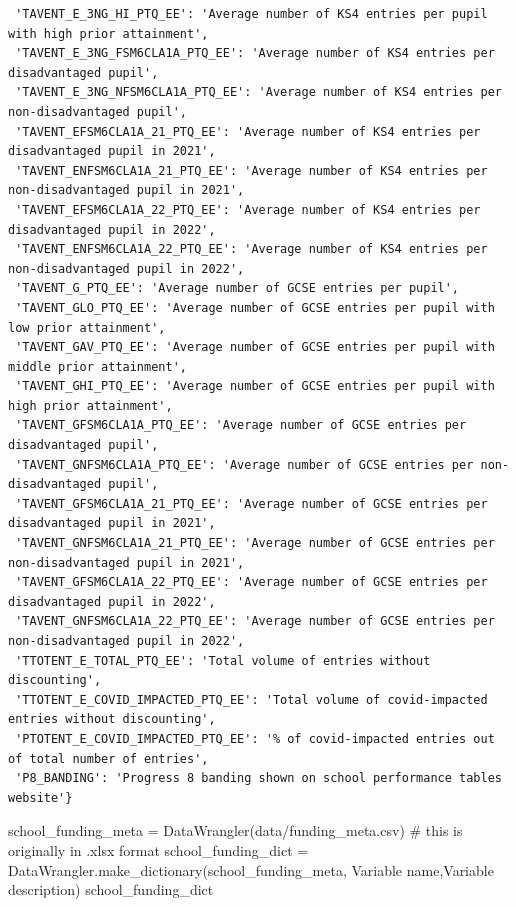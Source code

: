 \documentclass[
  letterpaper,
  DIV=11,
  numbers=noendperiod]{scrartcl}
\newenvironment{Shaded}{\begin{snugshade}}{\end{snugshade}}
\newcommand{\CommentTok}[1]{\textcolor[rgb]{0.37,0.37,0.37}{#1}}
\newcommand{\NormalTok}[1]{\textcolor[rgb]{0.00,0.23,0.31}{#1}}
\newcommand{\OperatorTok}[1]{\textcolor[rgb]{0.37,0.37,0.37}{#1}}
\newcommand{\StringTok}[1]{\textcolor[rgb]{0.13,0.47,0.30}{#1}}
\begin{document}
\begin{verbatim}
 'TAVENT_E_3NG_HI_PTQ_EE': 'Average number of KS4 entries per pupil with high prior attainment',
 'TAVENT_E_3NG_FSM6CLA1A_PTQ_EE': 'Average number of KS4 entries per disadvantaged pupil',
 'TAVENT_E_3NG_NFSM6CLA1A_PTQ_EE': 'Average number of KS4 entries per non-disadvantaged pupil',
 'TAVENT_EFSM6CLA1A_21_PTQ_EE': 'Average number of KS4 entries per disadvantaged pupil in 2021',
 'TAVENT_ENFSM6CLA1A_21_PTQ_EE': 'Average number of KS4 entries per non-disadvantaged pupil in 2021',
 'TAVENT_EFSM6CLA1A_22_PTQ_EE': 'Average number of KS4 entries per disadvantaged pupil in 2022',
 'TAVENT_ENFSM6CLA1A_22_PTQ_EE': 'Average number of KS4 entries per non-disadvantaged pupil in 2022',
 'TAVENT_G_PTQ_EE': 'Average number of GCSE entries per pupil',
 'TAVENT_GLO_PTQ_EE': 'Average number of GCSE entries per pupil with low prior attainment',
 'TAVENT_GAV_PTQ_EE': 'Average number of GCSE entries per pupil with middle prior attainment',
 'TAVENT_GHI_PTQ_EE': 'Average number of GCSE entries per pupil with high prior attainment',
 'TAVENT_GFSM6CLA1A_PTQ_EE': 'Average number of GCSE entries per disadvantaged pupil',
 'TAVENT_GNFSM6CLA1A_PTQ_EE': 'Average number of GCSE entries per non-disadvantaged pupil',
 'TAVENT_GFSM6CLA1A_21_PTQ_EE': 'Average number of GCSE entries per disadvantaged pupil in 2021',
 'TAVENT_GNFSM6CLA1A_21_PTQ_EE': 'Average number of GCSE entries per non-disadvantaged pupil in 2021',
 'TAVENT_GFSM6CLA1A_22_PTQ_EE': 'Average number of GCSE entries per disadvantaged pupil in 2022',
 'TAVENT_GNFSM6CLA1A_22_PTQ_EE': 'Average number of GCSE entries per non-disadvantaged pupil in 2022',
 'TTOTENT_E_TOTAL_PTQ_EE': 'Total volume of entries without discounting',
 'TTOTENT_E_COVID_IMPACTED_PTQ_EE': 'Total volume of covid-impacted entries without discounting',
 'PTOTENT_E_COVID_IMPACTED_PTQ_EE': '% of covid-impacted entries out of total number of entries',
 'P8_BANDING': 'Progress 8 banding shown on school performance tables website'}
\end{verbatim}

\begin{Shaded}
\begin{Highlighting}[]
\NormalTok{school\_funding\_meta }\OperatorTok{=}\NormalTok{ DataWrangler(}\StringTok{\textquotesingle{}data/funding\_meta.csv\textquotesingle{}}\NormalTok{) }\CommentTok{\# this is originally in .xlsx format}
\NormalTok{school\_funding\_dict }\OperatorTok{=}\NormalTok{ DataWrangler.make\_dictionary(school\_funding\_meta, }\StringTok{\textquotesingle{}Variable name\textquotesingle{}}\NormalTok{,}\StringTok{\textquotesingle{}Variable description\textquotesingle{}}\NormalTok{)}
\NormalTok{school\_funding\_dict}
\end{Highlighting}
\end{Shaded}
\end{document}
